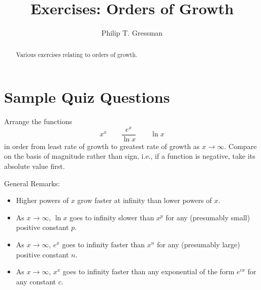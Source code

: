 \documentclass{ximera}
\title{Exercises: Orders of Growth}
\author{Philip T. Gressman}
\begin{document}
\begin{abstract}
Various exercises relating to orders of growth.
\end{abstract}
\maketitle

\section*{Sample Quiz Questions}

\begin{question}%

Arrange the functions 
\[ x^{x} \qquad \frac{e^{x}}{\ln{x}} \qquad \ln{x} \]
in order from least rate of growth to greatest rate of growth as \(x \rightarrow \infty\). Compare on the basis of magnitude rather than sign, i.e., if a function is negative, take its absolute value first.
\begin{multiplechoice}
\end{multiplechoice}
\begin{feedback}
General Remarks:
\begin{itemize} \item Higher powers of \(x\) grow faster at infinity than lower powers of \(x\).
\item As \(x \rightarrow \infty\), \(\ln x\) goes to infinity slower than \(x^p\) for any (presumably small) positive constant \(p\).
\item As \(x \rightarrow \infty\), \(e^x\) goes to infinity faster than \(x^n\) for any (presumably large) positive constant \(n\).
\item As \(x \rightarrow \infty\), \(x^x\) goes to infinity faster than any exponential of the form \(e^{cx}\) for any constant \(c\).
\end{itemize}
\end{feedback}

\end{question}
\end{document}
